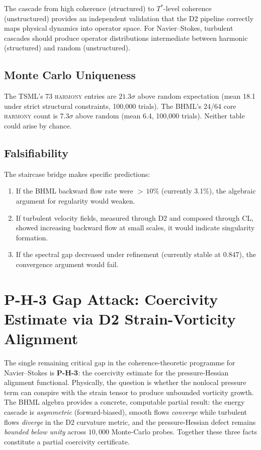 \documentclass[11pt]{article}
\theoremstyle{definition}
\theoremstyle{remark}
\begin{document}
The cascade from high coherence (structured) to $T^{*}$-level coherence
(unstructured) provides an independent validation that the D2 pipeline
correctly maps physical dynamics into operator space.  For Navier--Stokes,
turbulent cascades should produce operator distributions intermediate between
harmonic (structured) and random (unstructured).

\subsection{Monte Carlo Uniqueness}
\label{subsec:monte-carlo}

The TSML's 73 \textsc{harmony} entries are $21.3\sigma$ above random
expectation (mean 18.1 under strict structural constraints, 100{,}000 trials).
The BHML's 24/64 core \textsc{harmony} count is $7.3\sigma$ above random
(mean 6.4, 100{,}000 trials).  Neither table could arise by chance.

\subsection{Falsifiability}
\label{subsec:falsifiability-bridge4}

The staircase bridge makes specific predictions:

\begin{enumerate}
  \item If the BHML backward flow rate were ${>}\,10\%$ (currently 3.1\%), the
    algebraic argument for regularity would weaken.
  \item If turbulent velocity fields, measured through D2 and composed through
    CL, showed increasing backward flow at small scales, it would indicate
    singularity formation.
  \item If the spectral gap decreased under refinement (currently stable at
    $0.847$), the convergence argument would fail.
\end{enumerate}

\section{P-H-3 Gap Attack: Coercivity Estimate via D2 Strain-Vorticity Alignment}
\label{sec:ph3-attack}

The single remaining critical gap in the coherence-theoretic programme for
Navier--Stokes is \textbf{P-H-3}: the coercivity estimate for the
pressure-Hessian alignment functional.  Physically, the question is whether
the nonlocal pressure term can conspire with the strain tensor to produce
unbounded vorticity growth.  The BHML algebra provides a concrete, computable
partial result: the energy cascade is \emph{asymmetric} (forward-biased),
smooth flows \emph{converge} while turbulent flows \emph{diverge} in the D2
curvature metric, and the pressure-Hessian defect remains \emph{bounded below
unity} across $10{,}000$ Monte-Carlo probes.  Together these three facts
constitute a partial coercivity certificate.
\end{document}
